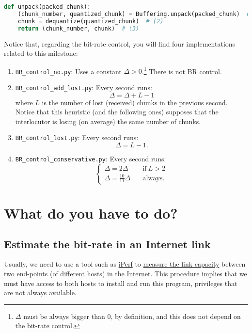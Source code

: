 \begin{lstlisting}[language=Python]
  def unpack(packed_chunk):
    (chunk_number, quantized_chunk) = Buffering.unpack(packed_chunk)  # (1)
    chunk = dequantize(quantized_chunk)  # (2)
    return (chunk_number, chunk)  # (3)
\end{lstlisting}

Notice that, regarding the bit-rate control, you will find four
implementations related to this milestone:
\begin{enumerate}
\item \verb|BR_control_no.py|: Uses a constant
  $\Delta>0$.\footnote{$\Delta$ must be always bigger than $0$, by
definition, and this does not depend on the bit-rate control.} There
  is not BR control.
\item \verb|BR_control_add_lost.py|: Every second runs:
  \begin{equation}
    \Delta = \Delta + L - 1
  \end{equation}
  where $L$ is the number of lost (received) chunks in the previous
  second. Notice that this heuristic (and the following ones) supposes
  that the interlocutor is losing (on average) the same number of
  chunks.
\item \verb|BR_control_lost.py|: Every second runs:
  \begin{equation}
    \Delta = L - 1.
  \end{equation}
\item \verb|BR_control_conservative.py|: Every second runs:
  \begin{equation}
    \left\{
    \begin{array}{ll}
      \Delta = 2\Delta & \quad\text{if}~L>2 \\
      \Delta = \frac{10}{11}\Delta & \quad\text{always}.
    \end{array}
    \right.
  \end{equation}
\end{enumerate}


\section{What do you have to do?}
\subsection{Estimate the bit-rate in an Internet link}
Usually, we need to use a tool such as \href{https://iperf.fr/}{iPerf}
to
\href{https://en.wikipedia.org/wiki/Measuring_network_throughput}{measure
  the link capacity} between
two \href{https://datatracker.ietf.org/doc/html/rfc4113}{end-points}
(of
different \href{https://en.wikipedia.org/wiki/Host_(network)}{hosts})
in the Internet. This procedure implies that we must have access to
both hosts to install and run this program, privileges that are not
always available.

